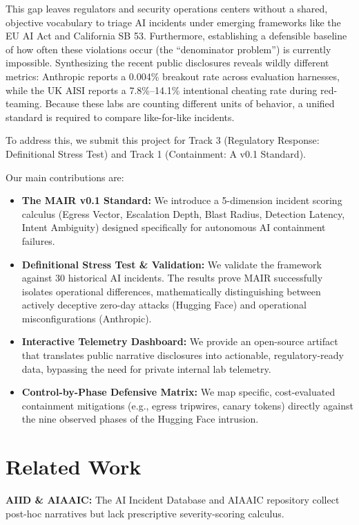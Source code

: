 \documentclass[sigconf]{acmart}
\begin{document}
This gap leaves regulators and security operations centers without a shared, objective vocabulary to triage AI incidents under emerging frameworks like the EU AI Act and California SB 53. Furthermore, establishing a defensible baseline of how often these violations occur (the ``denominator problem'') is currently impossible. Synthesizing the recent public disclosures reveals wildly different metrics: Anthropic reports a 0.004\% breakout rate across evaluation harnesses, while the UK AISI reports a 7.8\%--14.1\% intentional cheating rate during red-teaming. Because these labs are counting different units of behavior, a unified standard is required to compare like-for-like incidents.

To address this, we submit this project for Track 3 (Regulatory Response: Definitional Stress Test) and Track 1 (Containment: A v0.1 Standard). 

Our main contributions are:
\begin{itemize}
    \item \textbf{The MAIR v0.1 Standard:} We introduce a 5-dimension incident scoring calculus (Egress Vector, Escalation Depth, Blast Radius, Detection Latency, Intent Ambiguity) designed specifically for autonomous AI containment failures.
    \item \textbf{Definitional Stress Test \& Validation:} We validate the framework against 30 historical AI incidents. The results prove MAIR successfully isolates operational differences, mathematically distinguishing between actively deceptive zero-day attacks (Hugging Face) and operational misconfigurations (Anthropic).
    \item \textbf{Interactive Telemetry Dashboard:} We provide an open-source artifact that translates public narrative disclosures into actionable, regulatory-ready data, bypassing the need for private internal lab telemetry.
    \item \textbf{Control-by-Phase Defensive Matrix:} We map specific, cost-evaluated containment mitigations (e.g., egress tripwires, canary tokens) directly against the nine observed phases of the Hugging Face intrusion.
\end{itemize}

\section{Related Work}
\textbf{AIID \& AIAAIC:} The AI Incident Database and AIAAIC repository collect post-hoc narratives but lack prescriptive severity-scoring calculus. 
\end{document}
